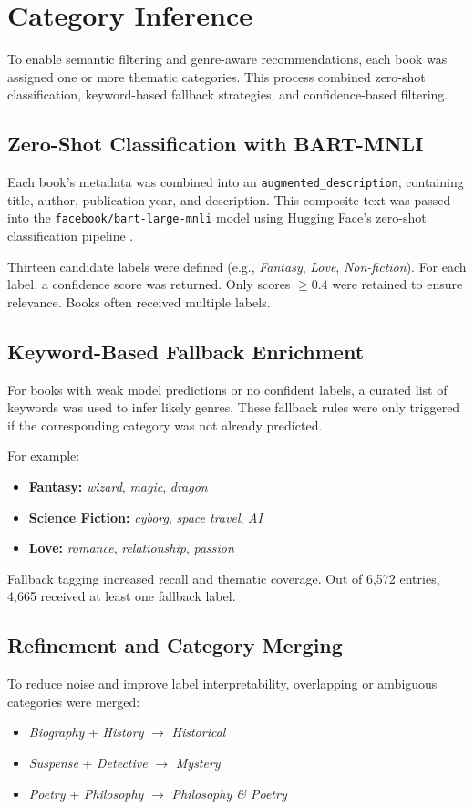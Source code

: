 \chapter{Category Inference}
\label{chapter:categories}

To enable semantic filtering and genre-aware recommendations, each book was assigned one or more thematic categories. This process combined zero-shot classification, keyword-based fallback strategies, and confidence-based filtering.

\section{Zero-Shot Classification with BART-MNLI}
Each book's metadata was combined into an \texttt{augmented\_description}, containing title, author, publication year, and description. 
This composite text was passed into the \texttt{facebook/bart-large-mnli} model using Hugging Face’s zero-shot classification pipeline \parencite{bart-large-mnli}.

Thirteen candidate labels were defined (e.g., \textit{Fantasy}, \textit{Love}, \textit{Non-fiction}). For each label, a confidence score was returned. Only scores $\geq 0.4$ were retained to ensure relevance. Books often received multiple labels.

\section{Keyword-Based Fallback Enrichment}
For books with weak model predictions or no confident labels, a curated list of keywords was used to infer likely genres. These fallback rules were only triggered if the corresponding category was not already predicted.

For example:
\begin{itemize}
    \item \textbf{Fantasy:} \textit{wizard}, \textit{magic}, \textit{dragon}
    \item \textbf{Science Fiction:} \textit{cyborg}, \textit{space travel}, \textit{AI}
    \item \textbf{Love:} \textit{romance}, \textit{relationship}, \textit{passion}
\end{itemize}

Fallback tagging increased recall and thematic coverage. Out of 6,572 entries, 4,665 received at least one fallback label.

\section{Refinement and Category Merging}
To reduce noise and improve label interpretability, overlapping or ambiguous categories were merged:
\begin{itemize}
    \item \textit{Biography} + \textit{History} $\rightarrow$ \textit{Historical}
    \item \textit{Suspense} + \textit{Detective} $\rightarrow$ \textit{Mystery}
    \item \textit{Poetry} + \textit{Philosophy} $\rightarrow$ \textit{Philosophy \& Poetry}
\end{itemize}

